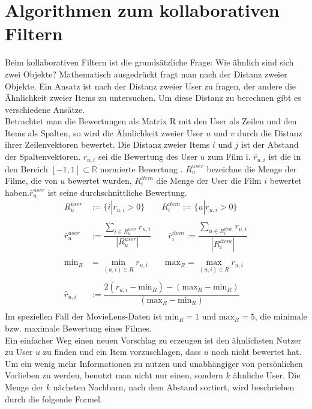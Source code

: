 \section{Algorithmen zum kollaborativen Filtern}\label{s.Algorithmen}\raggedbottom
Beim kollaborativen Filtern ist die grundsätzliche Frage: Wie ähnlich sind sich zwei Objekte?
Mathematisch ausgedrückt fragt man nach der Distanz zweier Objekte. Ein Ansatz ist nach der Distanz zweier User zu fragen, der andere die Ähnlichkeit zweier Items zu untersuchen. Um diese Distanz zu berechnen gibt es verschiedene Ansätze.\\
Betrachtet man die Bewertungen als Matrix R mit den User als Zeilen und den Items als Spalten, so wird die Ähnlichkeit zweier User $u$ und $v$ durch die Distanz ihrer Zeilenvektoren bewertet. Die Distanz zweier Items $i$ und $j$ ist der Abstand der Spaltenvektoren. $r_{u,i}$ sei die Bewertung des User $u$ zum Film i. $\hat{r}_{u,i}$ ist die in den Bereich $[-1,1]\subset \mathbb{R}$ normierte Bewertung .  $R^{user}_{u}$ bezeichne die Menge der Filme, die von $u$ bewertet wurden, $R^{item}_{i}$ die Menge der User die Film $i$ bewertet haben.$\bar{r}^{user}_{u}$ ist seine durchschnittliche Bewertung.
\begin{equation}
\begin{aligned}	
R^{user}_{u}&:=\{i | r_{u,i}>0\} \qquad 
R^{item}_{i}:=\{u | r_{u,i}>0\}\\\\
\bar{r}^{user}_{u}&:= \dfrac{\sum\limits_{i \in R^{user}_{u}}r_{u,i}}{|R^{user}_{u}|} \qquad
\bar{r}^{item}_{i}:= \dfrac{\sum\limits_{u \in R^{item}_{i}}r_{u,i}}{|R^{item}_{i}|}\\\\
\mathrm{min}_{R} &= \min\limits_{(u,i)\in R} r_{u,i} \qquad
\mathrm{max}_{R} = \max\limits_{(u,i)\in R} r_{u,i} \\\\
\hat{r}_{u,i}&:= \dfrac{2(r_{u,i}-\mathrm{min}_{R})-(\mathrm{max}_{R}-\mathrm{min}_{R})}{(\mathrm{max}_{R}-\mathrm{min}_{R})}\\
\label{definition}
\end{aligned}
\end{equation}
Im speziellen Fall der MovieLens-Daten ist $\mathrm{min}_{R} = 1$ und $\mathrm{max}_{R} = 5$, die minimale bzw. maximale Bewertung eines Filmes. \\
Ein einfacher Weg einen neuen Vorschlag zu erzeugen ist den ähnlichsten Nutzer zu User $u$ zu finden und ein Item vorzuschlagen, dass $u$ noch nicht bewertet hat. Um ein wenig mehr Informationen zu nutzen und unabhängiger von persönlichen Vorlieben zu werden, benutzt man nicht nur einen, sondern $k$ ähnliche User. Die Menge der $k$ nächsten Nachbarn, nach dem Abstand sortiert, wird beschrieben durch die folgende Formel.
